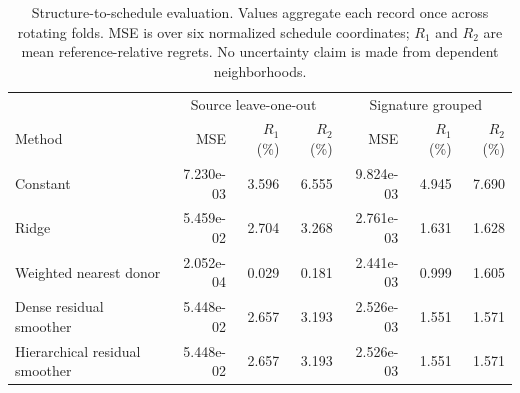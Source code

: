 \begin{table}[t]
\caption{\label{tab:results}Structure-to-schedule evaluation. Values aggregate each record once across rotating folds. MSE is over six normalized schedule coordinates; $R_1$ and $R_2$ are mean reference-relative regrets. No uncertainty claim is made from dependent neighborhoods.}
\centering\small
\begin{tabular}{lrrr@{\qquad}rrr}
\toprule
& \multicolumn{3}{c}{Source leave-one-out} & \multicolumn{3}{c}{Signature grouped}\\
Method & MSE & $R_1$ (\%) & $R_2$ (\%) & MSE & $R_1$ (\%) & $R_2$ (\%)\\
\midrule
Constant & 7.230e-03 & 3.596 & 6.555 & 9.824e-03 & 4.945 & 7.690\\
Ridge & 5.459e-02 & 2.704 & 3.268 & 2.761e-03 & 1.631 & 1.628\\
Weighted nearest donor & 2.052e-04 & 0.029 & 0.181 & 2.441e-03 & 0.999 & 1.605\\
Dense residual smoother & 5.448e-02 & 2.657 & 3.193 & 2.526e-03 & 1.551 & 1.571\\
Hierarchical residual smoother & 5.448e-02 & 2.657 & 3.193 & 2.526e-03 & 1.551 & 1.571\\
\bottomrule
\end{tabular}
\end{table}
